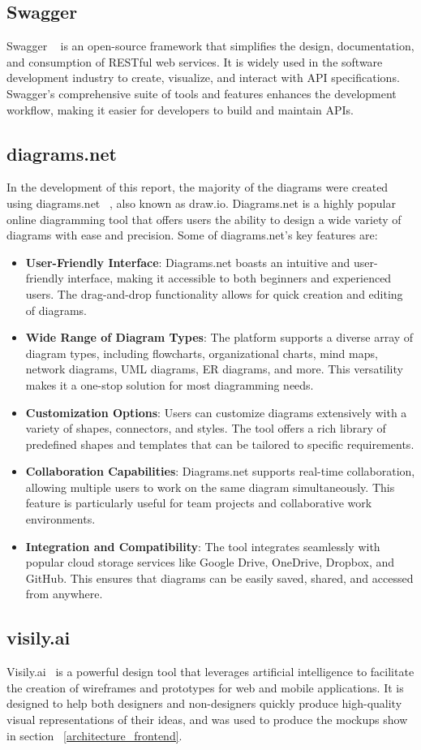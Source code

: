 \subsection{ Swagger }
Swagger ~\cite{Swagger} is an open-source framework that simplifies the design, documentation, and consumption of RESTful web services. It is widely used in the software development industry to create, visualize, and interact with API specifications. Swagger's comprehensive suite of tools and features enhances the development workflow, making it easier for developers to build and maintain APIs.

\subsection{ diagrams.net }
In the development of this report, the majority of the diagrams were created using diagrams.net ~\cite{diagrams.net}, also known as draw.io. Diagrams.net is a highly popular online diagramming tool that offers users the ability to design a wide variety of diagrams with ease and precision.
Some of diagrams.net's key features are:
\begin{itemize}
	\item \textbf{User-Friendly Interface}: Diagrams.net boasts an intuitive and user-friendly interface, making it accessible to both beginners and experienced users. The drag-and-drop functionality allows for quick creation and editing of diagrams.
	\item \textbf{Wide Range of Diagram Types}: The platform supports a diverse array of diagram types, including flowcharts, organizational charts, mind maps, network diagrams, UML diagrams, ER diagrams, and more. This versatility makes it a one-stop solution for most diagramming needs.
	\item \textbf{Customization Options}: Users can customize diagrams extensively with a variety of shapes, connectors, and styles. The tool offers a rich library of predefined shapes and templates that can be tailored to specific requirements.
	\item \textbf{Collaboration Capabilities}: Diagrams.net supports real-time collaboration, allowing multiple users to work on the same diagram simultaneously. This feature is particularly useful for team projects and collaborative work environments.
	\item \textbf{Integration and Compatibility}: The tool integrates seamlessly with popular cloud storage services like Google Drive, OneDrive, Dropbox, and GitHub. This ensures that diagrams can be easily saved, shared, and accessed from anywhere.
\end{itemize}

\subsection{ visily.ai }

Visily.ai~\cite{Visily} is a powerful design tool that leverages artificial intelligence to facilitate the creation of wireframes and prototypes for web and mobile applications. It is designed to help both designers and non-designers quickly produce high-quality visual representations of their ideas, and was used to produce the mockups show in section ~\ref{architecture_frontend}.